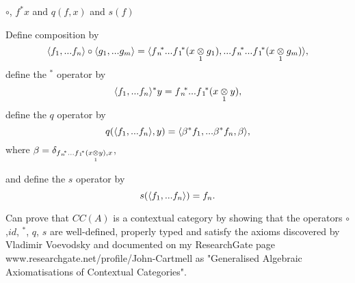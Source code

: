 \begin{frame}{$\circ$, $f^*x$ and $q(f,x)$ and $s(f)$}
\newcommand{\pullbackobject}{\fnvectorstar(\crossx{x}{y}{1})}
\newcommand{\deltaterm}{\delta_{\pullbackobject,x}}

Define composition by
\begin{equation} 
\tuple{f_1,...f_n}\circ \tuple{g_1,...g_m} 
=\tuple{\fnvectorstar(\crossx{x}{g_1}{1}),...\fnvectorstar(\crossx{x}{g_m}{1})},
\end{equation}
define the $^*$ operator by
\begin{equation} 
\tuple{\fn}^*y=\pullbackobject,
\end{equation}
define the $q$ operator by
\begin{equation} 
q(\tuple{\fn},y)=
\tuple{{\beta}^*f_1,...{\beta}^*f_n,\beta},
\end{equation}
where 
$\beta = \deltaterm$,

and define the $s$ operator by 
\begin{equation} 
s(\tuple{\fn})=f_n.
\end{equation}

Can prove that $CC(A)$ is a contextual category by showing that the operators
$\circ$,$id$, $^*$, $q$, $s$ are well-defined, properly typed and satisfy the axioms discovered by Vladimir Voevodsky and documented on my ResearchGate page
www.researchgate.net/profile/John-Cartmell
as 
"Generalised Algebraic Axiomatisations of Contextual Categories".
\end{frame}


